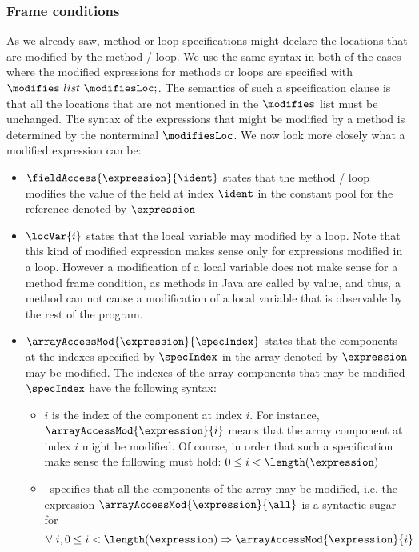 \subsubsection{Frame conditions} 
As we already saw, method or loop specifications  might declare the locations that are modified 
by the method / loop. We use the same syntax in both of the cases where the modified expressions for methods or loops are
 specified with $  \modifies  \ list \   \modifiesLoc;$. The semantics of such a specification clause is that 
all the locations that are not mentioned in the $\modifies$ list must be unchanged.
The syntax of the expressions that might be modified by a method is determined by the nonterminal
$  \modifiesLoc$. We now look more closely what a modified expression can be:
\begin{itemize}
      \item  $ \fieldAccess{\expression}{\ident} $ states that the method / loop modifies the value of the field at index $\ident$ 
             in the constant pool for the reference denoted by  $\expression$ 
      \item $\locVar{i}$ states that the local variable may modified by a loop. Note that this kind of modified
            expression makes sense only for expressions modified in a loop.
	    However a modification of a local variable does not make sense for a method frame condition, as methods in Java are called by value, and
	    thus, a method can not cause a modification of a local variable that is observable by the rest of the program.
	    
      \item  $\arrayAccessMod{\expression}{\specIndex}$ states that the components at the indexes specified by $\specIndex$ in
            the array denoted by $\expression$ may be modified. The indexes of the array components that may be modified $\specIndex$
	    have the following syntax:
	    \begin{itemize}
	          \item $i$ is the index of the component at index $i$. For instance, \\
		        $\arrayAccessMod{\expression}{i}$ means that the array component at index $i$ might be modified. Of course, in order that
			such a specification make sense the following must hold:
			$ 0  \le i < \length(\expression )   $
	          \item \all \ specifies that all the components of the array may be modified, i.e. the expression 
		         $\arrayAccessMod{\expression}{\all}$ is a syntactic sugar for 
                       $$ \forall \ i ,   0  \le i < \length(\expression ) \Rightarrow \arrayAccessMod{\expression}{i }$$
		       

\end{itemize}
\end{itemize}
